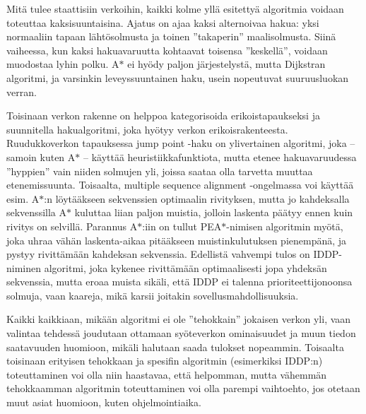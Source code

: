 \documentclass[12pt]{article}
\begin{document}
Mitä tulee staattisiin verkoihin, kaikki kolme yllä esitettyä algoritmia voidaan toteuttaa kaksisuuntaisina. Ajatus on ajaa kaksi alternoivaa hakua: yksi normaaliin tapaan lähtösolmusta ja toinen ''takaperin'' maalisolmusta. Siinä vaiheessa, kun kaksi hakuavaruutta kohtaavat toisensa ''keskellä'', voidaan muodostaa lyhin polku. A$\ast$ ei hyödy paljon järjestelystä, mutta Dijkstran algoritmi, ja varsinkin leveyssuuntainen haku, usein nopeutuvat suuruusluokan verran.

Toisinaan verkon rakenne on helppoa kategorisoida erikoistapaukseksi ja suunnitella hakualgoritmi, joka hyötyy verkon erikoisrakenteesta. Ruudukkoverkon tapauksessa jump point -haku on ylivertainen algoritmi, joka -- samoin kuten A$\ast$ -- käyttää heuristiikkafunktiota, mutta etenee hakuavaruudessa ''hyppien'' vain niiden solmujen yli, joissa saataa olla tarvetta muuttaa etenemissuunta. Toisaalta, multiple sequence alignment -ongelmassa voi käyttää esim. A$\ast$:n löytääkseen sekvenssien optimaalin rivityksen, mutta jo kahdeksalla sekvenssilla A$\ast$ kuluttaa liian paljon muistia, jolloin laskenta päätyy ennen kuin rivitys on selvillä. Parannus A$\ast$:iin on tullut PEA$\ast$-nimisen algoritmin myötä, joka uhraa vähän laskenta-aikaa pitääkseen muistinkulutuksen pienempänä, ja pystyy rivittämään kahdeksan sekvenssia. Edellistä vahvempi tulos on IDDP-niminen algoritmi, joka kykenee rivittämään optimaalisesti jopa yhdeksän sekvenssia, mutta eroaa muista sikäli, että IDDP ei talenna prioriteettijonoonsa solmuja, vaan kaareja, mikä karsii joitakin sovellusmahdollisuuksia.

Kaikki kaikkiaan, mikään algoritmi ei ole ''tehokkain'' jokaisen verkon yli, vaan valintaa tehdessä joudutaan ottamaan syöteverkon ominaisuudet ja muun tiedon saatavuuden huomioon, mikäli halutaan saada tulokset nopeammin. Toisaalta toisinaan erityisen tehokkaan ja spesifin algoritmin (esimerkiksi IDDP:n) toteuttaminen voi olla niin haastavaa, että helpomman, mutta vähemmän tehokkaamman algoritmin toteuttaminen voi olla parempi vaihtoehto, jos otetaan muut asiat huomioon, kuten ohjelmointiaika.
\end{document}
